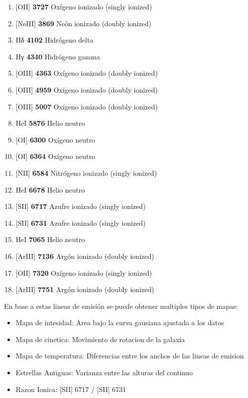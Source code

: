 \documentclass[9pt,twocolumn,a4paper]{opticajnl}
\begin{document}
\begin{enumerate}
  \item {[OII] \textbf{3727} Oxígeno ionizado (singly ionized)}
  \item {[NeIII] \textbf{3869} Neón ionizado (doubly ionized)}
  \item {Hδ \textbf{4102} Hidrógeno delta}
  \item {Hγ \textbf{4340} Hidrógeno gamma}
  \item {[OIII] \textbf{4363} Oxígeno ionizado (doubly ionized)}
  \item {[OIII] \textbf{4959} Oxígeno ionizado (doubly ionized)}
  \item {[OIII] \textbf{5007} Oxígeno ionizado (doubly ionized)}
  \item {HeI \textbf{5876} Helio neutro}
  \item {[OI] \textbf{6300} Oxígeno neutro}
  \item {[OI] \textbf{6364} Oxígeno neutro}
  \item {[NII] \textbf{6584} Nitrógeno ionizado (singly ionized)}
  \item {HeI \textbf{6678} Helio neutro}
  \item {[SII] \textbf{6717} Azufre ionizado (singly ionized)}
  \item {[SII] \textbf{6731} Azufre ionizado (singly ionized)}
  \item {HeI \textbf{7065} Helio neutro}
  \item {[ArIII] \textbf{7136} Argón ionizado (doubly ionized)}
  \item {[OII] \textbf{7320} Oxígeno ionizado (singly ionized)}
  \item {[ArIII] \textbf{7751} Argón ionizado (doubly ionized)}
\end{enumerate}

En base a estas lineas de emisión se puede obtener multiples tipos de mapas:
\begin{itemize}
  \item{Mapa de intesidad: Area bajo la curva gausiana ajustada a los datos        } 
  \item{Mapa de cinetica: Movimiento de rotacion de la galaxia                     } 
  \item{Mapa de temperatura: Diferencias entre los anchos de las lineas de emision } 
  \item{Estrellas Antiguas: Varianza entre las alturas del continuo                } 
  \item{Razon Ionica:  [SII] 6717 / [SII] 6731                                     } 
\end{itemize}
\end{document}
